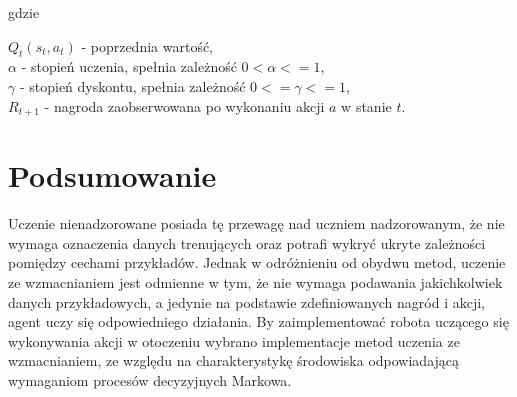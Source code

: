 gdzie

$ Q_{t}(s_{t}, a_{t}) $ - poprzednia wartość,\\
$\alpha$ - stopień uczenia,  spełnia zależność $ 0 < \alpha <= 1 $,\\
$\gamma$ - stopień dyskontu, 	spełnia zależność $ 0 <= \gamma <= 1 $,\\
$R_{t+1}$ - nagroda zaobserwowana po wykonaniu akcji $a$ w stanie $t$.\\





\section{Podsumowanie}

Uczenie nienadzorowane posiada tę przewagę nad uczniem nadzorowanym, że nie wymaga oznaczenia danych trenujących 
oraz potrafi wykryć ukryte zależności pomiędzy cechami przykładów. Jednak w odróżnieniu od obydwu metod, uczenie ze 
wzmacnianiem jest odmienne w tym, że nie wymaga podawania jakichkolwiek danych przykładowych, a jedynie na podstawie 
zdefiniowanych nagród i akcji, agent uczy się odpowiedniego działania.
By zaimplementować robota uczącego się wykonywania akcji w otoczeniu wybrano implementacje metod uczenia ze 
wzmacnianiem, ze względu na charakterystykę środowiska odpowiadającą wymaganiom procesów decyzyjnych Markowa.












